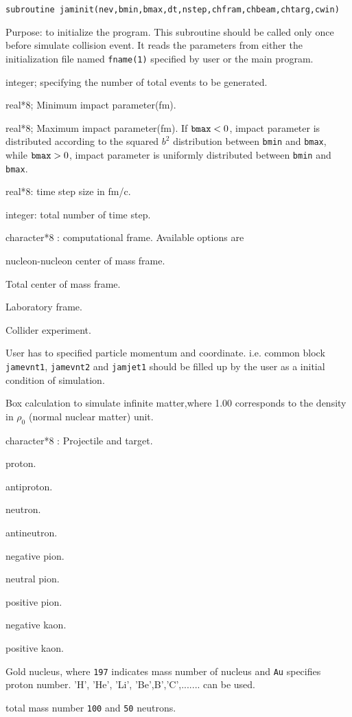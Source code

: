 \documentclass[]{article}
\newenvironment{entry}%
{\begin{list}{}{\setlength{\topsep}{0mm} \setlength{\itemsep}{0mm}
\setlength{\parskip}{0mm} \setlength{\parsep}{0mm}
\setlength{\leftmargin}{20mm} \setlength{\rightmargin}{0mm}
\setlength{\labelwidth}{18mm} \setlength{\labelsep}{2mm}}}%
{\end{list}}
\newenvironment{subentry}%
{\begin{list}{}{\setlength{\topsep}{0mm} \setlength{\itemsep}{0mm}
\setlength{\parskip}{0mm} \setlength{\parsep}{0mm}
\setlength{\leftmargin}{10mm} \setlength{\rightmargin}{0mm}
\setlength{\labelwidth}{18mm} \setlength{\labelsep}{2mm}}}%
{\end{list}}
\newcommand{\ttt}[1]{{\tt#1}}
\newcommand{\itemt}[1]{\item[{\tt #1}\hfill]}
\newcommand{\iteme}[1]{\item[{\tt #1}]}
\begin{document}
\begin{verbatim}
subroutine jaminit(nev,bmin,bmax,dt,nstep,chfram,chbeam,chtarg,cwin)
\end{verbatim}
Purpose: to initialize the program.
This subroutine should be called only once before simulate collision event.
 It reads the parameters
from either the initialization file named {\tt fname(1)} specified by user
or the main program.
\medskip

\begin{entry}
\iteme{nev:} integer; specifying the number of total events
  to be generated.
\iteme{bmin:} real*8; Minimum impact parameter(fm).
\iteme{bmax:} real*8; Maximum impact parameter(fm).
If ${\tt bmax}<0$, impact parameter is distributed
      according to the squared $b^2$ distribution
       between {\tt bmin} and {\tt bmax},
     while ${\tt bmax}>0$, impact parameter is uniformly distributed
     between {\tt bmin} and {\tt bmax}.

\iteme{dt:} real*8: time step size in fm/c.

\iteme{nstep:} integer: total number of time step.

\iteme{chfram:} character*8 : computational frame. Available options are
  \begin{subentry}
    \iteme{'nn':}        nucleon-nucleon center of mass frame.
    \iteme{'cm':}        Total center of mass frame.
    \iteme{'lab':}       Laboratory frame.
    \iteme{'collider':} Collider experiment.
    \iteme{'user':}   User has to specified particle momentum and
                     coordinate. i.e.  common block \ttt{jamevnt1},
                      \ttt{jamevnt2} and \ttt{jamjet1}
                     should be filled up by the user as a initial condition
                     of simulation.
    \iteme{'box1.00':} Box calculation to simulate infinite matter,where
                       1.00 corresponds to the density in
                        $\rho_{0}$ (normal nuclear matter) unit.
  \end{subentry}

\iteme{chbeam, chtarg:} character*8 : Projectile and target.
 \begin{subentry}
  \iteme{'p':}     proton.
  \iteme{'pbar':}  antiproton.
  \iteme{'n':}     neutron.
  \iteme{'nbar':}  antineutron.
  \iteme{'pi-':}   negative pion.
  \iteme{'pi0':}   neutral pion.
  \iteme{'pi+':}   positive pion.
  \iteme{'k-':}    negative kaon.
  \iteme{'k+':}    positive kaon.
  \iteme{'197Au'}  Gold nucleus,
         where \ttt{197} indicates mass number of nucleus
         and {\tt Au} specifies proton number.
          'H', 'He', 'Li', 'Be',B','C',....... can be used.
  \itemt{\tt '100:50'} total mass number \ttt{100} and \ttt{50} neutrons.
 \end{subentry}


\end{entry}
\end{document}
